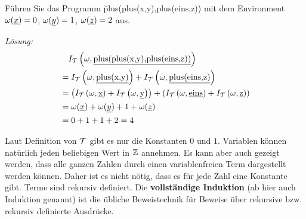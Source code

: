 \begin{bsp}
Führen Sie das Programm \u{plus(plus(x,y),plus(eins,z))} mit dem Environment $\omega(\underline{x})=0$, $\omega(\underline{y})=1$, $\omega(\underline{z})=2$ aus.

\textit{Lösung:}
\begin{align*}
&\quad I_{\mathcal{T}}\left(\omega,\text{\underline{plus(plus(x,y),plus(eins,z))}}\right)\\
&= I_{\mathcal{T}}\left(\omega,\text{\underline{plus(x,y)}}\right) + I_{\mathcal{T}}\left(\omega,\text{\underline{plus(eins,z)}}\right) \\
&= \left(I_{\mathcal{T}}\left(\omega,\text{\underline{x}}\right) + I_{\mathcal{T}}\left(\omega,\text{\underline{y}}\right)\right) + \left(I_{\mathcal{T}}\left(\omega,\text{\underline{eins}}\right) + I_{\mathcal{T}}\left(\omega,\text{\underline{z}}\right)\right) \\
&= \omega(\underline{x}) + \omega(\underline{y}) + 1 + \omega(\underline{z}) \\
&= 0+1+1+2 = 4
\end{align*}
\end{bsp}

Laut Definition von $\mathcal{T}$ gibt es nur die Konstanten $0$ und $1$. Variablen können natürlich jeden beliebigen Wert in $\mathbb{Z}$ annehmen.
Es kann aber auch gezeigt werden, dass alle ganzen Zahlen durch einen variablenfreien Term dargestellt werden können. Daher ist es nicht nötig, dass es für jede Zahl eine Konstante gibt.
Terme sind rekursiv definiert. Die \textbf{vollständige Induktion} (ab hier auch Induktion genannt) ist die übliche Beweistechnik für Beweise über rekursive bzw. rekursiv definierte Ausdrücke.

